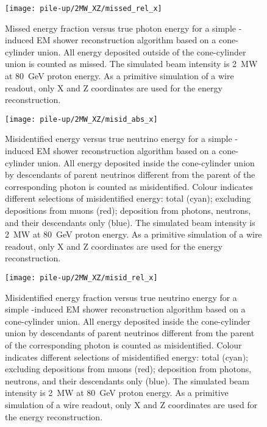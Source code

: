\begin{figure}[htb]
	\centering
	\texttt{[image: pile-up/2MW\_XZ/missed\_rel\_x]}
	\caption{Missed energy fraction versus true photon energy for a simple \Pgpz-induced EM shower reconstruction algorithm based on a cone-cylinder union.
		All energy deposited outside of the cone-cylinder union is counted as missed.
		The simulated beam intensity is \SI{2}{\mega\watt} at \SI{80}{\giga\electronvolt} proton energy.
		As a primitive simulation of a wire readout, only X and Z coordinates are used for the energy reconstruction.}
	\label{fig:dune-nd_2MW-XZ_missed-rel-x}
\end{figure}

\begin{figure}[htb]
	\centering
	\texttt{[image: pile-up/2MW\_XZ/misid\_abs\_x]}
	\caption{Misidentified energy versus true neutrino energy for a simple \Pgpz-induced EM shower reconstruction algorithm based on a cone-cylinder union.
		All energy deposited inside the cone-cylinder union by descendants of parent neutrinos different from the parent of the corresponding \Pgpz photon is counted as misidentified.
		Colour indicates different selections of misidentified energy: total (cyan); excluding depositions from muons (red); deposition from photons, neutrons, and their descendants only (blue).
		The simulated beam intensity is \SI{2}{\mega\watt} at \SI{80}{\giga\electronvolt} proton energy.
		As a primitive simulation of a wire readout, only X and Z coordinates are used for the energy reconstruction.}
	\label{fig:dune-nd_2MW-XZ_misid-abs-x}
\end{figure}

\begin{figure}[htb]
	\centering
	\texttt{[image: pile-up/2MW\_XZ/misid\_rel\_x]}
	\caption{Misidentified energy fraction versus true neutrino energy for a simple \Pgpz-induced EM shower reconstruction algorithm based on a cone-cylinder union.
		All energy deposited inside the cone-cylinder union by descendants of parent neutrinos different from the parent of the corresponding \Pgpz photon is counted as misidentified.
		Colour indicates different selections of misidentified energy: total (cyan); excluding depositions from muons (red); deposition from photons, neutrons, and their descendants only (blue).
		The simulated beam intensity is \SI{2}{\mega\watt} at \SI{80}{\giga\electronvolt} proton energy.
		As a primitive simulation of a wire readout, only X and Z coordinates are used for the energy reconstruction.}
	\label{fig:dune-nd_2MW-XZ_misid-rel-x}
\end{figure}

